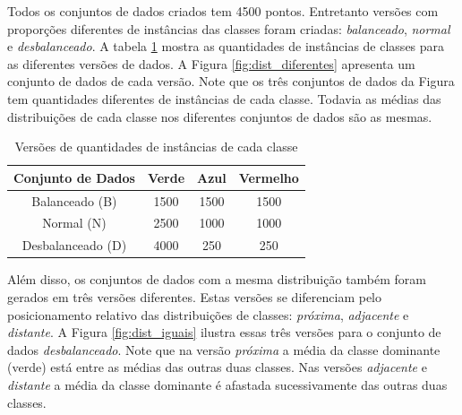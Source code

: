 Todos os conjuntos de dados criados tem 4500 pontos.
Entretanto versões com proporções diferentes de instâncias das classes foram criadas: \textit{balanceado}, \textit{normal} e \textit{desbalanceado}.
A tabela \ref{tab:dados_sinteticos} mostra as quantidades de instâncias de classes para as diferentes versões de dados.
A Figura \ref{fig:dist_diferentes} apresenta um conjunto de dados de cada versão.
Note que os três conjuntos de dados da Figura tem quantidades diferentes de instâncias de cada classe.
Todavia as médias das distribuições de cada classe nos diferentes conjuntos de dados são as mesmas.

\begin{table}[h!]
  \begin{center}
    \begin{tabular}{cccc}
      \hline
      \textbf{Conjunto de Dados} & \textbf{Verde} & \textbf{Azul} & \textbf{Vermelho}\\
      \hline

Balanceado (B)	&	 1500 & 1500 & 1500	\\
Normal (N)	&	 2500 & 1000 & 1000	\\
Desbalanceado (D)      & 4000 & 250 & 250	\\

      \hline
    \end{tabular}
    \caption{Versões de quantidades de instâncias de cada classe}
    \label{tab:dados_sinteticos}
  \end{center}
\end{table}

Além disso, os conjuntos de dados com a mesma distribuição também foram gerados em três versões diferentes.
Estas versões se diferenciam pelo posicionamento relativo das distribuições de classes: \textit{próxima}, \textit{adjacente} e \textit{distante}.
A Figura \ref{fig:dist_iguais} ilustra essas três versões para o conjunto de dados \textit{desbalanceado}.
Note que na versão \textit{próxima} a média da classe dominante (verde) está entre as médias das outras duas classes.
Nas versões \textit{adjacente} e \textit{distante} a média da classe dominante é afastada sucessivamente das outras duas classes.

